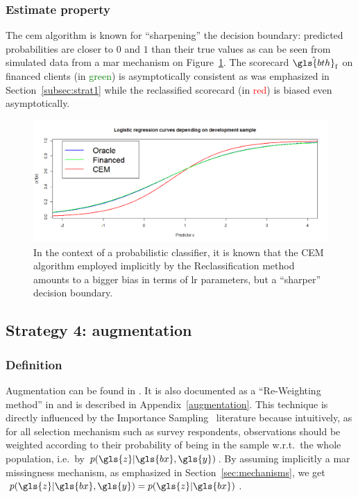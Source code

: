 \subsubsection{Estimate property}
The \gls{cem} algorithm is known for ``sharpening'' the decision boundary: predicted probabilities are closer to $0$ and $1$ than their true values as can be seen from simulated data from a \gls{mar} mechanism on Figure~\ref{fig:biais_CEM}. The scorecard $\hat{\gls{bth}}_{\text{f}}$ on financed clients (in \textcolor{green}{green}) is asymptotically consistent as was emphasized in Section~\ref{subsec:strat1} while the reclassified scorecard (in \textcolor{red}{red}) is biased even asymptotically.

\begin{figure}[ht]
\center \includegraphics[width=\textwidth]{figures/chapitre2/CEM_bias.png}
\caption{In the context of a probabilistic classifier, it is known that the CEM algorithm employed implicitly by the Reclassification method amounts to a bigger bias in terms of \gls{lr} parameters, but a ``sharper'' decision boundary.}
\label{fig:biais_CEM}
\end{figure}


\subsection{Strategy 4: augmentation} \label{subsec:augmentation}

\subsubsection{Definition}
Augmentation can be found in \cite{RI6}. It is also documented as a ``Re-Weighting method'' in \cite{saporta,banasik,economix} and is described in Appendix~\ref{augmentation}. This technique is directly influenced by the Importance Sampling~\cite{zadrozny2004learning} literature because intuitively, as for all selection mechanism such as survey respondents, observations should be weighted according to their probability of being in the sample w.r.t.\ the whole population, i.e.\ by $p(\gls{z} | \gls{bx},\gls{y})$. By assuming implicitly a \gls{mar} missingness mechanism, as emphasized in Section~\ref{sec:mechanisms}, we get $p(\gls{z} | \gls{bx}, \gls{y}) = p(\gls{z} | \gls{bx})$. 

